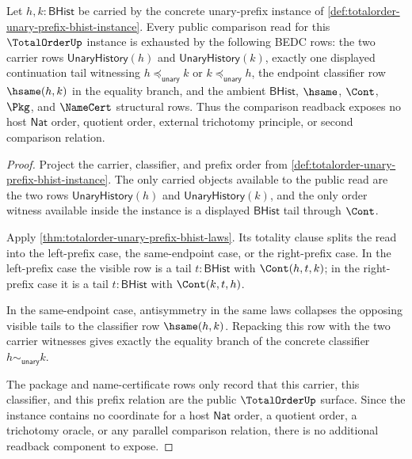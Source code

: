 \begin{theorem}
\label{thm:totalorder-unary-prefix-comparison-readback-totality}
Let $h,k:\mathsf{BHist}$ be carried by the concrete unary-prefix instance of
\autoref{def:totalorder-unary-prefix-bhist-instance}. Every public comparison
read for this $\TotalOrderUp$ instance is exhausted by the following BEDC rows:
the two carrier rows $\mathsf{UnaryHistory}(h)$ and
$\mathsf{UnaryHistory}(k)$, exactly one displayed continuation tail witnessing
$h\preceq_{\mathsf{unary}}k$ or $k\preceq_{\mathsf{unary}}h$, the endpoint
classifier row $\hsame(h,k)$ in the equality branch, and the ambient
$\mathsf{BHist}$, $\hsame$, $\Cont$, $\Pkg$, and $\NameCert$ structural rows.
Thus the comparison readback exposes no host $\mathsf{Nat}$ order, quotient
order, external trichotomy principle, or second comparison relation.
\end{theorem}
\begin{proof}
Project the carrier, classifier, and prefix order from
\autoref{def:totalorder-unary-prefix-bhist-instance}. The only carried objects
available to the public read are the two rows $\mathsf{UnaryHistory}(h)$ and
$\mathsf{UnaryHistory}(k)$, and the only order witness available inside the
instance is a displayed $\mathsf{BHist}$ tail through $\Cont$.

Apply \autoref{thm:totalorder-unary-prefix-bhist-laws}. Its totality clause
splits the read into the left-prefix case, the same-endpoint case, or the
right-prefix case. In the left-prefix case the visible row is a tail
$t:\mathsf{BHist}$ with $\Cont(h,t,k)$; in the right-prefix case it is a tail
$t:\mathsf{BHist}$ with $\Cont(k,t,h)$.

In the same-endpoint case, antisymmetry in the same laws collapses the opposing
visible tails to the classifier row $\hsame(h,k)$. Repacking this row with the
two carrier witnesses gives exactly the equality branch of the concrete
classifier $h\sim_{\mathsf{unary}}k$.

The package and name-certificate rows only record that this carrier, this
classifier, and this prefix relation are the public $\TotalOrderUp$ surface.
Since the instance contains no coordinate for a host $\mathsf{Nat}$ order, a
quotient order, a trichotomy oracle, or any parallel comparison relation, there
is no additional readback component to expose.
\end{proof}
